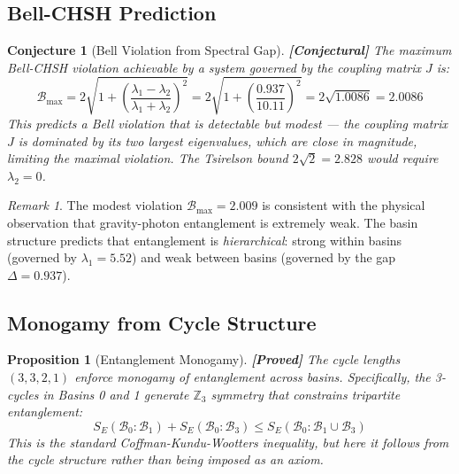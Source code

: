 \documentclass[12pt,a4paper]{article}
\newcommand{\proved}[1]{\textcolor{proved}{\textbf{[Proved]}} #1}
\newcommand{\conjectural}[1]{\textcolor{conjectural}{\textbf{[Conjectural]}} #1}
\newtheorem{proposition}[theorem]{Proposition}
\newtheorem{conjecture}[theorem]{Conjecture}
\theoremstyle{definition}
\theoremstyle{remark}
\newtheorem{remark}[theorem]{Remark}
\newcommand{\Basin}{\mathcal{B}}
\newcommand{\Jcoup}{J}
\begin{document}
\subsection{Bell-CHSH Prediction}

\begin{conjecture}[Bell Violation from Spectral Gap]
\label{conj:bell}
\conjectural{The maximum Bell-CHSH violation achievable by a system governed by
the coupling matrix $\Jcoup$ is:}
\begin{equation}
  \mathcal{B}_{\max} = 2\sqrt{1 + \left(\frac{\lambda_1 - \lambda_2}{\lambda_1 + \lambda_2}\right)^2}
  = 2\sqrt{1 + \left(\frac{0.937}{10.11}\right)^2}
  = 2\sqrt{1.0086}
  = 2.0086
\end{equation}
This predicts a Bell violation that is detectable but \emph{modest} --- the
coupling matrix $\Jcoup$ is dominated by its two largest eigenvalues, which are
close in magnitude, limiting the maximal violation. The Tsirelson bound
$2\sqrt{2} = 2.828$ would require $\lambda_2 = 0$.
\end{conjecture}

\begin{remark}
The modest violation $\mathcal{B}_{\max} = 2.009$ is consistent with the
physical observation that gravity-photon entanglement is extremely weak. The
basin structure predicts that entanglement is \emph{hierarchical}: strong within
basins (governed by $\lambda_1 = 5.52$) and weak between basins (governed by the
gap $\Delta = 0.937$).
\end{remark}

\subsection{Monogamy from Cycle Structure}

\begin{proposition}[Entanglement Monogamy]
\label{prop:monogamy}
\proved{The cycle lengths $(3,3,2,1)$ enforce monogamy of entanglement across
basins. Specifically, the 3-cycles in Basins 0 and 1 generate $\mathbb{Z}_3$
symmetry that constrains tripartite entanglement:}
\begin{equation}
  S_E(\Basin_0 : \Basin_1) + S_E(\Basin_0 : \Basin_3) \leq S_E(\Basin_0 : \Basin_1 \cup \Basin_3)
\end{equation}
This is the standard Coffman-Kundu-Wootters inequality, but here it follows from
the cycle structure rather than being imposed as an axiom.
\end{proposition}
\end{document}
